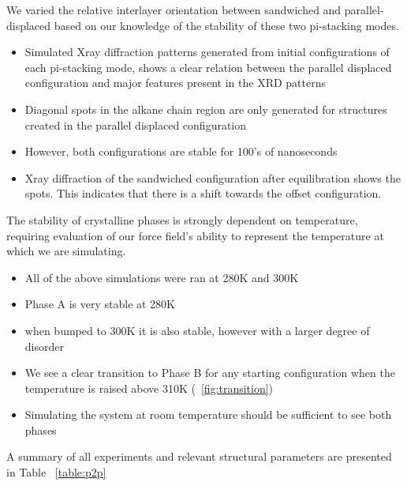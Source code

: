 \documentclass{article}
\begin{document}
	We varied the relative interlayer orientation between sandwiched and parallel-displaced based on our knowledge of the stability of these two pi-stacking modes.
        \begin{itemize}
		\item Simulated Xray diffraction patterns generated from initial configurations of each pi-stacking mode, shows a 
clear relation between the parallel displaced configuration and major features present in the XRD patterns %
		\item Diagonal spots in the alkane chain region are only generated for structures created in the parallel displaced configuration
		\item However, both configurations are stable for 100's of nanoseconds
		\item Xray diffraction of the sandwiched configuration after equilibration shows the spots. This indicates that there is a shift towards the offset configuration.
	\end{itemize} 

	The stability of crystalline phases is strongly dependent on temperature, requiring evaluation of our force field's ability to represent the temperature at which we are simulating.
	\begin{itemize}
		\item All of the above simulations were ran at 280K and 300K
		\item Phase A is very stable at 280K
		\item when bumped to 300K it is also stable, however with a larger degree of disorder %
		\item We see a clear transition to Phase B for any starting configuration when the temperature is raised above 310K (~\ref{fig:transition})
		\item Simulating the system at room temperature should be sufficient to see both phases
	\end{itemize}

	A summary of all experiments and relevant structural parameters are presented in Table ~\ref{table:p2p}
\end{document}
